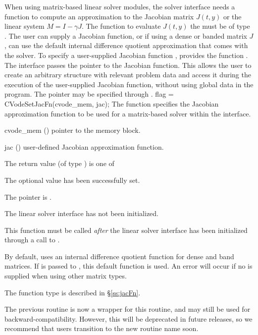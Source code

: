 When using matrix-based linear solver modules, the {\cvls} solver interface
needs a function to compute an approximation to the Jacobian matrix $J(t,y)$ or
the linear system $M = I - \gamma J$. The function to evaluate $J(t,y)$ the must
be of type . The user can supply a Jacobian function, or if using
a dense or banded matrix $J$, can use the default internal difference quotient
approximation
that comes with the {\cvls} solver. To specify a user-supplied Jacobian function
, {\cvls} provides the function . The {\cvls}
interface passes the pointer  to the Jacobian function. This
allows the user to create an arbitrary structure with relevant problem data and
access it during the execution of the user-supplied Jacobian function, without
using global data in the program. The pointer  may be specified
through .
{
  flag = CVodeSetJacFn(cvode\_mem, jac);
}
{
  The function  specifies the Jacobian
  approximation function to be used for a matrix-based solver within
  the {\cvls} interface.
}
{
  \begin{args}
  \item[cvode\_mem] ()
    pointer to the {\cvodes} memory block.
  \item[jac] ()
    user-defined Jacobian approximation function.
  \end{args}
}
{
  The return value  (of type ) is one of
  \begin{args}
  \item[\Id{CVLS\_SUCCESS}]
    The optional value has been successfully set.
  \item[\Id{CVLS\_MEM\_NULL}]
    The  pointer is .
  \item[\Id{CVLS\_LMEM\_NULL}]
    The {\cvls} linear solver interface has not been initialized.
  \end{args}
}
{
  This function must be called \emph{after} the {\cvls} linear solver
  interface has been initialized through a call to
  .

  By default, {\cvls} uses an internal difference quotient function
  for dense and band matrices.  If  is passed to ,
  this default function is used.  An error will occur if no 
  is supplied when using other matrix types.

  The function type  is described in \S\ref{ss:jacFn}.

  The previous routine  is now a wrapper for this
  routine, and may still be used for backward-compatibility.  However,
  this will be deprecated in future releases, so we recommend that
  users transition to the new routine name soon.
}
